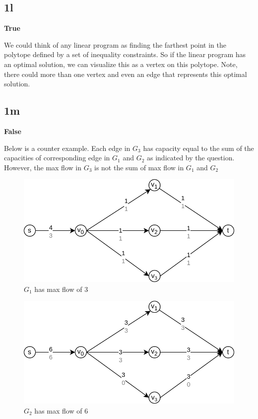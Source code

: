 \documentclass{article}
\begin{document}
    \subsection*{1l}
    \textbf{True}

    We could think of any linear program as finding the farthest point in the polytope defined by a set of inequality constraints. So if the linear program has an optimal solution, we can visualize this as a vertex on this polytope. Note, there could more than one vertex and even an edge that represents this optimal solution.

    \subsection*{1m}
    \textbf{False}

    Below is a counter example. Each edge in $G_3$ has capacity equal to the sum of the capacities of corresponding edge in $G_1$ and $G_2$ as indicated by the question. However, the max flow in $G_3$ is not the sum of max flow in $G_1$ and $G_2$

    \begin{figure}[H]
        \includegraphics[width=1\textwidth]{maxflow1.png}
        \caption{$G_1$ has max flow of 3}
    \end{figure}

    \begin{figure}[H]
        \includegraphics[width=1\textwidth]{maxflow2.png}
        \caption{$G_2$ has max flow of 6}
    \end{figure}
\end{document}
